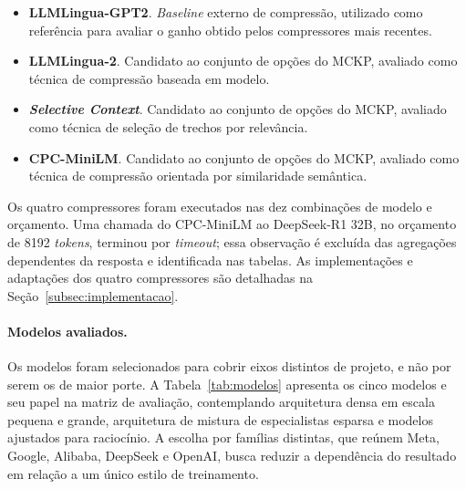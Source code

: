 \begin{itemize}[leftmargin=1.6em]
\item \textbf{LLMLingua-GPT2}. \textit{Baseline} externo de compressão, utilizado como referência para avaliar o ganho obtido pelos compressores mais recentes.

\item \textbf{LLMLingua-2}. Candidato ao conjunto de opções do MCKP, avaliado como técnica de compressão baseada em modelo.

\item \textbf{\textit{Selective Context}}. Candidato ao conjunto de opções do MCKP, avaliado como técnica de seleção de trechos por relevância.

\item \textbf{CPC-MiniLM}. Candidato ao conjunto de opções do MCKP, avaliado como técnica de compressão orientada por similaridade semântica.
\end{itemize}

Os quatro compressores foram executados nas dez combinações de modelo e orçamento. Uma chamada do CPC-MiniLM ao DeepSeek-R1 32B, no orçamento de 8192 \textit{tokens}, terminou por \textit{timeout}; essa observação é excluída das agregações dependentes da resposta e identificada nas tabelas. As implementações e adaptações dos quatro compressores são detalhadas na Seção~\ref{subsec:implementacao}.


\paragraph{Modelos avaliados.}
Os modelos foram selecionados para cobrir eixos distintos de projeto, e não por serem os de maior porte. A Tabela~\ref{tab:modelos} apresenta os cinco modelos e seu papel na matriz de avaliação, contemplando arquitetura densa em escala pequena e grande, arquitetura de mistura de especialistas esparsa e modelos ajustados para raciocínio. A escolha por famílias distintas, que reúnem Meta, Google, Alibaba, DeepSeek e OpenAI, busca reduzir a dependência do resultado em relação a um único estilo de treinamento.

